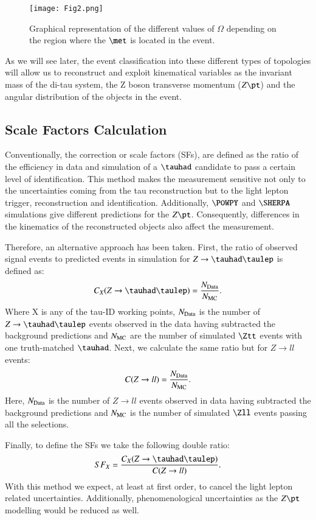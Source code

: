 \begin{figure}[htbp]
	\centering
	\texttt{[image: Fig2.png]}
	\caption{Graphical representation of the different values of $\Omega$ depending on the region where the $\met$ is located in the event.}
	\label{Fig2}
\end{figure}
As we will see later, the event classification into these different types of topologies will allow us to reconstruct and exploit kinematical variables as the invariant mass of the di-tau system, the Z boson transverse momentum ($Z\pt$) and the angular distribution of the objects in the event.

\subsection{Scale Factors Calculation}\label{sec3.2}
Conventionally, the correction or scale factors (SFs), are defined as the ratio of the efficiency in data and simulation of a $\tauhad$ candidate to pass a certain level of identification. This method makes the measurement sensitive not only to the uncertainties coming from the tau reconstruction but to the light lepton trigger, reconstruction and identification. Additionally, $\POWPY$ and $\SHERPA$ simulations give different predictions for the $Z\pt$. Consequently, differences in the kinematics of the reconstructed objects also affect the measurement.

Therefore, an alternative approach has been taken. First, the ratio of observed signal events to predicted events in simulation for $Z\to\tauhad\taulep$ is defined as:
\begin{equation}
	C_{X}(Z\to\tauhad\taulep)=\frac{\NData}{\NMC}.
\end{equation}
Where X is any of the tau-ID working points, $N_{\text{Data}}$ is the number of $Z\to\tauhad\taulep$ events observed in the data having subtracted the background predictions and $N_{\text{MC}}$ are the number of simulated $\Ztt$ events with one truth-matched $\tauhad$. Next, we calculate the same ratio but for $Z\to ll$ events:
\begin{equation}
C(Z\to ll)=\frac{N_{\text{Data}}}{N_{\text{MC}}}.
\end{equation}
Here, $N_{\text{Data}}$ is the number of $Z\to ll$ events observed in data having subtracted the background predictions and $N_{\text{MC}}$ is the number of simulated $\Zll$ events passing all the selections.

Finally, to define the SFs we take the following double ratio:
\begin{equation}
SF_{X}=\frac{C_{X}(Z\to\tauhad\taulep)}{C(Z\to ll)}.
\end{equation}
With this method we expect, at least at first order, to cancel the light lepton related uncertainties. Additionally, phenomenological uncertainties as the $Z\pt$ modelling would be reduced as well.
